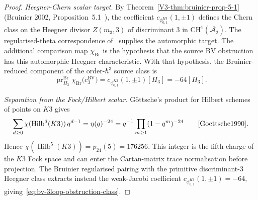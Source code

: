 \begin{proof}
\emph{Heegner-Chern scalar target.}
By Theorem~\ref{V3-thm:bruinier-prop-5-1} (Bruinier 2002,
Proposition~5.1~\cite{Bruinier2002}), the coefficient
\(c_{\phi_{0,1}^{K3}}(1,\pm1)\) defines the Chern class on the Heegner divisor
$Z(m_3,3)$ of discriminant $3$ in
$\mathrm{CH}^1(\overline{\mathcal{A}_2})$. The regularised-theta
correspondence of~\cite[Ch.~5, Thm.~5.12]{Bruinier2002} supplies the
automorphic target. The additional comparison map \(\chi_{\mathrm{Br}}\)
is the hypothesis that the source BV obstruction has this automorphic
Heegner characteristic. With that hypothesis, the Bruinier-reduced
component of the order-\(\hbar^3\) source class is
\[
 \operatorname{pr}_{H_3}^{\mathrm{Br}}
 \chi_{\mathrm{Br}}\bigl(c_3^{\mathrm{BV}}\bigr)
 =
 c_{\phi_{0,1}^{K3}}(1,\pm1)[H_3]=-64[H_3].
\]

\emph{Separation from the Fock/Hilbert scalar.}
G\"ottsche's product for Hilbert schemes of points on $K3$ gives
\[
 \sum_{d\geq 0}\chi(\operatorname{Hilb}^d(K3))\,q^{d-1}
 =
 \eta(q)^{-24}
 =
 q^{-1}\prod_{m\geq 1}(1-q^m)^{-24}
 \qquad\cite{Goettsche1990}.
\]
Hence $\chi(\operatorname{Hilb}^5(K3))=p_{24}(5)=176256$. This integer
is the fifth charge of the $K3$ Fock space and can enter the
Cartan-matrix trace normalisation before projection. The Bruinier
regularised pairing with the primitive discriminant-$3$ Heegner class
extracts instead the weak-Jacobi coefficient
\(c_{\phi_{0,1}^{K3}}(1,\pm1)=-64\), giving~\eqref{eq:bv-3loop-obstruction-class}.

\end{proof}

